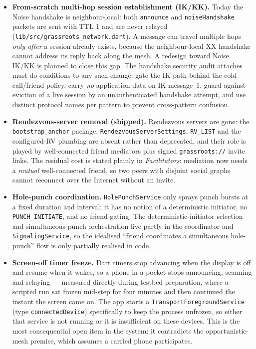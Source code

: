 \documentclass[11pt]{report}
\newcommand{\code}[1]{\texttt{\small #1}}
\begin{document}
\begin{itemize}
  \item \textbf{From-scratch multi-hop session establishment (IK/KK).} Today the Noise handshake is neighbour-local: both \code{announce} and \code{noiseHandshake} packets are sent with TTL 1 and are never relayed (\code{lib/src/grassroots\_network.dart}). A message can travel multiple hops \emph{only after} a session already exists, because the neighbour-local XX handshake cannot address its reply back along the mesh. A redesign toward Noise IK/KK is planned to close this gap. The handshake security audit attaches must-do conditions to any such change: gate the IK path behind the cold-call/friend policy, carry \emph{no} application data on IK message~1, guard against eviction of a live session by an unauthenticated handshake attempt, and use distinct protocol names per pattern to prevent cross-pattern confusion.
  \item \textbf{Rendezvous-server removal (shipped).} Rendezvous servers are gone: the \code{bootstrap\_anchor} package, \code{RendezvousServerSettings}, \code{RV\_LIST} and the configured-RV plumbing are absent rather than deprecated, and their role is played by well-connected friend mediators plus signed \code{grassroots://} invite links. The residual cost is stated plainly in \emph{Facilitators}: mediation now needs a \emph{mutual} well-connected friend, so two peers with disjoint social graphs cannot reconnect over the Internet without an invite.
  \item \textbf{Hole-punch coordination.} \code{HolePunchService} only sprays punch bursts at a fixed duration and interval; it has no notion of a deterministic initiator, no \code{PUNCH\_INITIATE}, and no friend-gating. The deterministic-initiator selection and simultaneous-punch orchestration live partly in the coordinator and \code{SignalingService}, so the idealised ``friend coordinates a simultaneous hole-punch'' flow is only partially realised in code.
  \item \textbf{Screen-off timer freeze.} Dart timers stop advancing when the display is off and resume when it wakes, so a phone in a pocket stops announcing, scanning and relaying --- measured directly during testbed preparation, where a scripted run sat frozen mid-step for four minutes and then continued the instant the screen came on. The app starts a \code{TransportForegroundService} (type \code{connectedDevice}) specifically to keep the process unfrozen, so either that service is not running or it is insufficient on these devices. This is the most consequential open item in the system: it contradicts the opportunistic-mesh premise, which assumes a carried phone participates.

\end{itemize}
\end{document}
